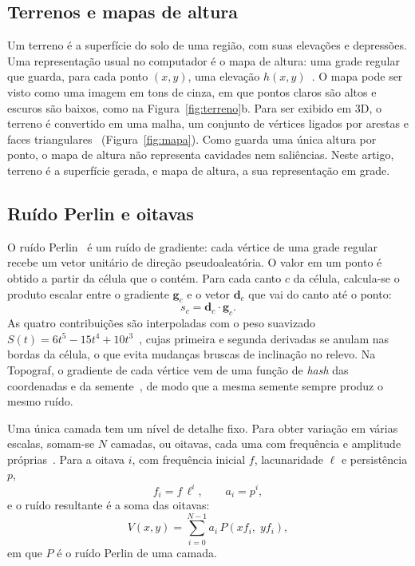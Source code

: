 \documentclass[sigconf, nonacm, screen, language=portuguese, language={main=english}]{acmart}
\begin{document}
\subsection{Terrenos e mapas de altura}\label{sec:terreno}
Um terreno é a superfície do solo de uma região, com suas elevações e
depressões. Uma representação usual no computador é o mapa de altura:
uma grade regular que guarda, para cada ponto $(x,y)$, uma elevação
$h(x,y)$~\cite{patel_terrain_noise}. O mapa pode ser visto como uma
imagem em tons de cinza, em que pontos claros são altos e escuros são
baixos, como na Figura~\ref{fig:terreno}b. Para ser exibido em 3D, o
terreno é convertido em uma malha, um conjunto de vértices ligados por
arestas e faces triangulares~\cite{learnopengl}
(Figura~\ref{fig:mapa}). Como guarda uma única
altura por ponto, o mapa de altura não representa cavidades nem
saliências. Neste artigo, terreno é a superfície gerada, e mapa de
altura, a sua representação em grade.

\subsection{Ruído Perlin e oitavas}\label{sec:perlin}
O ruído Perlin~\cite{perlin1985image} é um ruído de gradiente: cada
vértice de uma grade regular recebe um vetor unitário de direção
pseudoaleatória. O valor em um ponto é obtido a partir da célula que o
contém. Para cada canto $c$ da célula, calcula-se o produto escalar entre
o gradiente $\mathbf{g}_c$ e o vetor $\mathbf{d}_c$ que vai do canto até
o ponto:
\begin{equation}
  s_c = \mathbf{d}_c \cdot \mathbf{g}_c .
  \label{eq:produto}
\end{equation}
As quatro contribuições são interpoladas com o peso suavizado
$S(t) = 6t^5 - 15t^4 + 10t^3$~\cite{perlin2002improving}, cujas primeira e segunda derivadas se
anulam nas bordas da célula, o que evita mudanças bruscas de inclinação
no relevo. Na Topograf, o gradiente de cada vértice vem de uma função de
\textit{hash} das coordenadas e da semente~\cite{zipped_perlin_noise}, de
modo que a mesma semente sempre produz o mesmo ruído.

Uma única camada tem um nível de detalhe fixo. Para obter variação em
várias escalas, somam-se $N$ camadas, ou oitavas, cada uma com
frequência e amplitude próprias~\cite{patel_terrain_noise}. Para a oitava
$i$, com frequência inicial $f$, lacunaridade $\ell$ e persistência $p$,
\begin{equation}
  f_i = f\,\ell^{i}, \qquad a_i = p^{i},
  \label{eq:freq_amp}
\end{equation}
e o ruído resultante é a soma das oitavas:
\begin{equation}
  V(x,y) = \sum_{i=0}^{N-1} a_i\, P(x f_i,\; y f_i),
  \label{eq:oitavas}
\end{equation}
em que $P$ é o ruído Perlin de uma camada.
\end{document}
